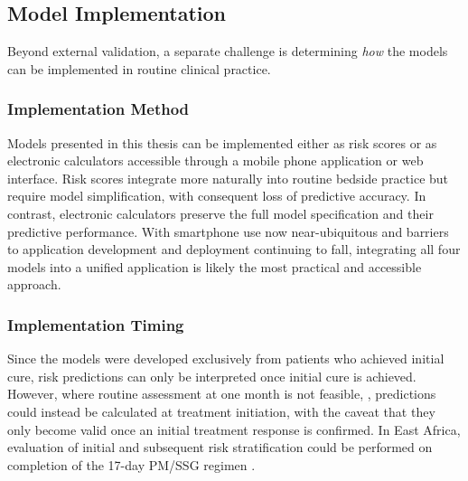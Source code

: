\subsection{Model Implementation}

Beyond external validation, a separate challenge is determining \textit{how} the models can be implemented in routine clinical practice.

\subsubsection{Implementation Method}

Models presented in this thesis can be implemented either as risk scores or as electronic calculators accessible through a mobile phone application or web interface\cite{collins2024A,bonnettGuidePresentingClinical2019}. Risk scores integrate more naturally into routine bedside practice but require model simplification, with consequent loss of predictive accuracy. In contrast, electronic calculators preserve the full model specification and their predictive performance. With smartphone use now near-ubiquitous and barriers to application development and deployment continuing to fall, integrating all four models into a unified application is likely the most practical and accessible approach\cite{liu2022,watson2019}. 

\subsubsection{Implementation Timing}

Since the models were developed exclusively from patients who achieved initial cure, risk predictions can only be interpreted once initial cure is achieved. However, where routine assessment at one month is not feasible, , predictions could instead be calculated at treatment initiation, with the caveat that they only become valid once an initial treatment response is confirmed. In East Africa, evaluation of initial and subsequent risk stratification could be performed on completion of the 17-day PM/SSG regimen \cite{WHO2026Leishmaniasis}.

